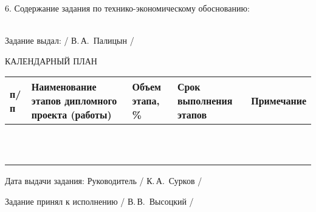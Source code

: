{  6. Содержание задания по технико-экономическому обоснованию:
  \lineunderscore\\
  \lineunderscore\\
  \lineunderscore

  Задание выдал: \hfill{} \uline{\hspace*{6em}} / В.\,А.~Палицын /   

  \vspace{1em}


  \vfill

  \begin{center}
    КАЛЕНДАРНЫЙ ПЛАН
  \end{center}

  \begin{tabular}{| >{\centering}m{} 
                  | >{\centering}m{} 
                  | >{\centering}m{}
                  | >{\centering}m{}  
                  | >{\centering\arraybackslash}m{}|}
    \hline \No{} \No{} п/п & Наименование этапов дипломного проекта (работы) & Объем этапа, \% & Срок выполнения этапов & Примечание \\
    \hline & & & & \\
    \hline & & & & \\
    \hline & & & & \\
    \hline & & & & \\
    \hline & & & & \\
    \hline & & & & \\
    \hline & & & & \\
    \hline & & & & \\
    \hline & & & & \\
    \hline & & & & \\
    \hline & & & & \\
    \hline
  \end{tabular}

  \vspace{2em}

  Дата выдачи задания: \uline{\hspace*{6em}} \hspace{2ex} Руководитель \hfill{} \uline{\hspace*{4em}} / К.\,А.~Сурков /

  \vspace{1em}

  Задание принял к исполнению \hfill{} \uline{\hspace*{4em}} / В.\,В.~Высоцкий /

  \restoregeometry
}